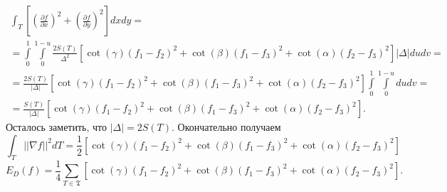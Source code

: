     \begin{multline*}
        \int_{T}{\left[\left(\frac{\partial f}{\partial x}\right)^2 + \left(\frac{\partial f}{\partial y}\right)^2 \right] dx dy} = \\
        = \int\limits_0^1\int\limits_0^{1-u} \frac{2S(T)}{\Delta^2} 
        \left[
            \cot{(\gamma)} (f_1 - f_2)^2 + \cot{(\beta)}(f_1 - f_3)^2 + \cot{(\alpha)}(f_2 - f_3)^2 
        \right] 
        |\Delta| du dv = \\
        = \frac{2S(T)}{|\Delta|} 
        \left[
            \cot{(\gamma)} (f_1 - f_2)^2 + \cot{(\beta)}(f_1 - f_3)^2 + \cot{(\alpha)}(f_2 - f_3)^2 
        \right]
        \int\limits_0^1\int\limits_0^{1-u} du dv = \\ 
        = \frac{S(T)}{|\Delta|} 
        \left[
            \cot{(\gamma)} (f_1 - f_2)^2 + \cot{(\beta)}(f_1 - f_3)^2 + \cot{(\alpha)}(f_2 - f_3)^2 
        \right].
    \end{multline*}
    Осталось заметить, что $|\Delta| = 2S(T)$. Окончательно получаем 
    $$
        \int_T ||\nabla{f}||^2 dT = \frac{1}{2} \left[ \cot{(\gamma)} (f_1 - f_2)^2 + \cot{(\beta)}(f_1 - f_3)^2 + \cot{(\alpha)}(f_2 - f_3)^2 \right] 
    $$
\begin{equation}
\label{formula:Pinkall}
  E_D(f) = \frac{1}{4} \sum_{T \in \mathfrak{T}} \left[ \cot{(\gamma)} (f_1 - f_2)^2 + \cot{(\beta)}(f_1 - f_3)^2 + \cot{(\alpha)}(f_2 - f_3)^2 \right].
\end{equation}
